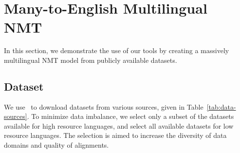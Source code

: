 \begin{comment}
\begin{listing}[ht]
\scriptsize
\inputminted{yaml}{sample-conf.yml}
\caption{An example \textit{conf.yml} file from an RTG experiment.}
\end{listing}


\begin{table}[]
    \centering
    \footnotesize
    \begin{tabular}{l  l| r r}
        NMT & BPE Impl  & NewsTest18 & NewsTest19 \\ \hline \hline
        \rtg & \nlcodec\   & 32.6   & 29.0 \\
        \rtg & \scriptsize{\sentpiece\ }& 32.3 & 28.7 \\
        FairSeq & subword-nmt & & \\
        T2T &  (built-in) & &
    \end{tabular}
    \caption{Transformer-base model is trained on the datasets shown in Listing~\ref{lst:mtdata-eg} for 200K optimizer updates having a batch size of 4200 tokens. All models use shared 8000 BPE subwords as vocabulary. The BLEU scores are from \sacrebleu\ \texttt{BLEU+c.mixed+l.de-en+\#.1+s.exp+
    t.wmt1\{8,9\}+tok.13a+v.1.4.13}.  }
    \label{tab:my_label}
\end{table}

\end{comment}



\section{Many-to-English Multilingual NMT}
\label{sec:500-eng}
In this section, we demonstrate the use of our tools by creating a massively multilingual NMT model from publicly available datasets. 

\subsection{Dataset}
\label{sec:datasets}
We use \mtdata\ to download datasets from various sources, given in Table~\ref{tab:data-sources}. 
To minimize data imbalance, we select only a subset of the datasets available for high resource languages, and select all available datasets for low resource languages. The selection is aimed to increase the diversity of data domains and quality of alignments. 

